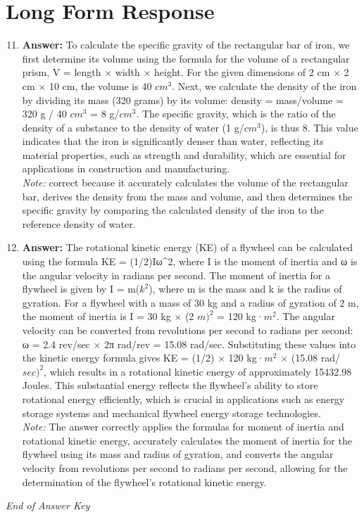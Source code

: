 \documentclass[12pt]{article}
\begin{document}
\section*{Long Form Response}
\begin{enumerate}[label=\arabic*.]
\setcounter{enumi}{10}
\item \textbf{Answer:} To calculate the specific gravity of the rectangular bar of iron, we first determine its volume using the formula for the volume of a rectangular prism, V = length \ensuremath{\times} width \ensuremath{\times} height. For the given dimensions of 2 cm \ensuremath{\times} 2 cm \ensuremath{\times} 10 cm, the volume is 40 $cm^3$. Next, we calculate the density of the iron by dividing its mass (320 grams) by its volume: density = mass/volume = 320 g / 40 $cm^3$ = 8 g/$cm^3$. The specific gravity, which is the ratio of the density of a substance to the density of water (1 g/$cm^3$), is thus 8. This value indicates that the iron is significantly denser than water, reflecting its material properties, such as strength and durability, which are essential for applications in construction and manufacturing.
\\ \textit{Note:} correct because it accurately calculates the volume of the rectangular bar, derives the density from the mass and volume, and then determines the specific gravity by comparing the calculated density of the iron to the reference density of water.
\item \textbf{Answer:} The rotational kinetic energy (KE) of a flywheel can be calculated using the formula KE = (1/2)Iω^2, where I is the moment of inertia and ω is the angular velocity in radians per second. The moment of inertia for a flywheel is given by I = m($k^2$), where m is the mass and k is the radius of gyration. For a flywheel with a mass of 30 kg and a radius of gyration of 2 m, the moment of inertia is I = 30 kg \ensuremath{\times} (2 $m)^2$ = 120 kg·$m^2$. The angular velocity can be converted from revolutions per second to radians per second: ω = 2.4 rev/sec \ensuremath{\times} 2π rad/rev = 15.08 rad/sec. Substituting these values into the kinetic energy formula gives KE = (1/2) \ensuremath{\times} 120 kg·$m^2$ \ensuremath{\times} (15.08 rad/$sec)^2$, which results in a rotational kinetic energy of approximately 15432.98 Joules. This substantial energy reflects the flywheel's ability to store rotational energy efficiently, which is crucial in applications such as energy storage systems and mechanical flywheel energy storage technologies.
\\ \textit{Note:} The answer correctly applies the formulas for moment of inertia and rotational kinetic energy, accurately calculates the moment of inertia for the flywheel using its mass and radius of gyration, and converts the angular velocity from revolutions per second to radians per second, allowing for the determination of the flywheel's rotational kinetic energy.
\end{enumerate}

\vfill
\noindent\textit{End of Answer Key}
\end{document}
